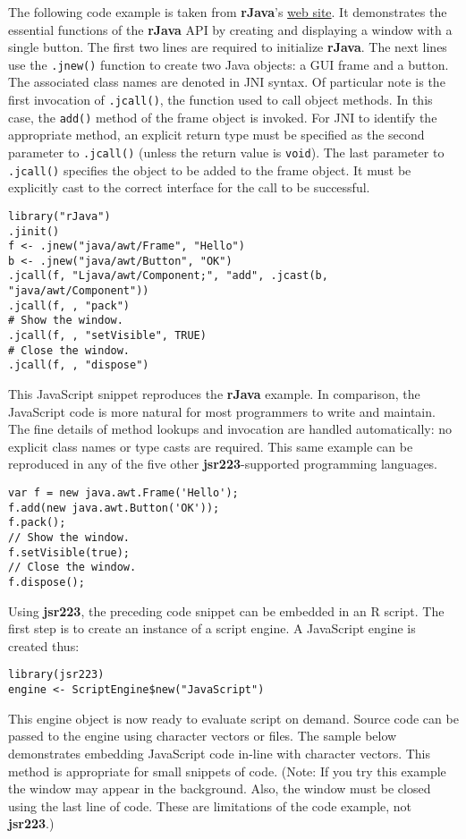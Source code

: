 The following code example is taken from \textbf{rJava}'s \href{http://www.rforge.net/rJava/}{web site}. It demonstrates the essential functions of the \textbf{rJava} API by creating and displaying a window with a single button. The first two lines are required to initialize \textbf{rJava}. The next lines use the \texttt{.jnew()} function to create two Java objects: a GUI frame and a button. The associated class names are denoted in JNI syntax. Of particular note is the first invocation of \texttt{.jcall()}, the function used to call object methods. In this case, the \texttt{add()} method of the frame object is invoked. For JNI to identify the appropriate method, an explicit return type must be specified as the second parameter to \texttt{.jcall()} (unless the return value is \texttt{void}). The last parameter to \texttt{.jcall()} specifies the object to be added to the frame object. It must be explicitly cast to the correct interface for the call to be successful.

\begin{verbatim}
library("rJava")
.jinit()
f <- .jnew("java/awt/Frame", "Hello")
b <- .jnew("java/awt/Button", "OK")
.jcall(f, "Ljava/awt/Component;", "add", .jcast(b, "java/awt/Component"))
.jcall(f, , "pack")
# Show the window.
.jcall(f, , "setVisible", TRUE)
# Close the window.
.jcall(f, , "dispose")
\end{verbatim}

This JavaScript snippet reproduces the \textbf{rJava} example. In comparison, the JavaScript code is more natural for most programmers to write and maintain. The fine details of method lookups and invocation are handled automatically: no explicit class names or type casts are required. This same example can be reproduced in any of the five other \textbf{jsr223}-supported programming languages.

\begin{verbatim}
var f = new java.awt.Frame('Hello');
f.add(new java.awt.Button('OK'));
f.pack();
// Show the window.
f.setVisible(true);
// Close the window.
f.dispose();
\end{verbatim}

Using \textbf{jsr223}, the preceding code snippet can be embedded in an R script. The first step is to create an instance of a script engine. A JavaScript engine is created thus:

\begin{verbatim}
library(jsr223)
engine <- ScriptEngine$new("JavaScript")
\end{verbatim}
This engine object is now ready to evaluate script on demand. Source code can be passed to the engine using character vectors or files. The sample below demonstrates embedding JavaScript code in-line with character vectors. This method is appropriate for small snippets of code. (Note: If you try this example the window may appear in the background. Also, the window must be closed using the last line of code. These are limitations of the code example, not \textbf{jsr223}.)

